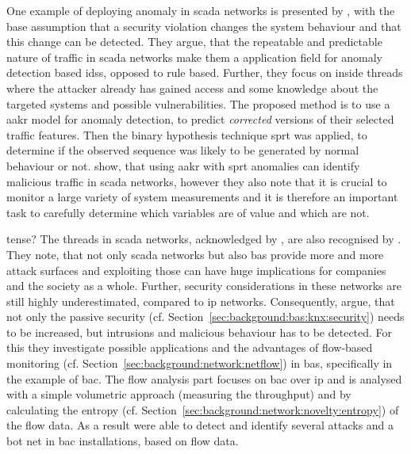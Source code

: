 One example of deploying anomaly in \gls{scada} networks is presented by \textcite{Yang2006}, with the base assumption that a security violation changes the system behaviour and that this change can be detected. They argue, that the repeatable and predictable nature of traffic in \gls{scada} networks make them a application field for anomaly detection based \glspl{ids}, opposed to rule based.
Further, they focus on inside threads where the attacker already has gained access and some knowledge about the targeted systems and possible vulnerabilities.
The proposed method is to use a \gls{aakr} model for anomaly detection, to predict \emph{corrected} versions of their selected traffic features. Then the binary hypothesis technique \gls{sprt} was applied, to determine if the observed sequence was likely to be generated by normal behaviour or not.
\textcite{Yang2006} show, that using \gls{aakr} with \gls{sprt} anomalies can identify malicious traffic in \gls{scada} networks, however they also note that it is crucial to monitor a large variety of system measurements and it is therefore an important task to carefully determine which variables are of value and which are not.

\alert{tense?}
The threads in \gls{scada} networks, acknowledged by \textcite{Yang2006}, are also recognised by \textcite{Celeda2012}. They note, that not only \gls{scada} networks but also \gls{bas} provide more and more attack surfaces and exploiting those can have huge implications for companies and the society as a whole.
Further, security considerations in these networks are still highly underestimated, compared to \gls{ip} networks.
Consequently, \textcite{Celeda2012} argue, that not only the passive security (cf. Section~\ref{sec:background:bas:knx:security}) needs to be increased, but intrusions and malicious behaviour has to be detected. For this they investigate possible applications and the advantages of flow-based monitoring (cf. Section~\ref{sec:background:network:netflow}) in \gls{bas}, specifically in the example of \gls{bac}.
The flow analysis part focuses on \gls{bac} over \gls{ip} and is analysed with a simple volumetric approach (measuring the throughput) and by calculating the entropy (cf. Section~\ref{sec:background:network:novelty:entropy}) of the flow data.
As a result \textcite{Celeda2012} were able to detect and identify several attacks and a bot net in \gls{bac} installations, based on flow data.

